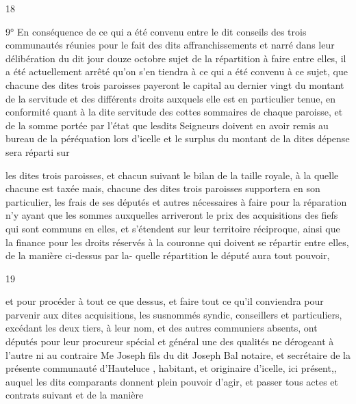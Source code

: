 \documentclass[a4paper,twoside,openany]{article}
\begin{document}
\begin{center}
18
\end{center}
9° En conséquence de ce qui a été convenu entre le dit
conseils des trois communautés réunies pour le
fait des dits affranchissements et narré dans leur
délibération du dit jour douze octobre sujet de la
répartition à faire entre elles, il a été actuellement
arrêté qu’on s’en tiendra à ce qui a été convenu à ce
sujet, que chacune des dites trois paroisses payeront le
capital au dernier vingt du montant de la servitude
et des différents droits auxquels elle est en particulier
tenue, en conformité quant à la dite servitude des
cottes sommaires de chaque paroisse, et de la somme
portée par l’état que lesdits Seigneurs doivent en avoir remis
au bureau de la péréquation lors d’icelle et le surplus
du montant de la dites dépense sera réparti sur


les dites trois paroisses, et chacun suivant le bilan
de la taille royale, à la quelle chacune est taxée
mais, chacune des dites trois paroisses supportera en
son particulier, les frais de ses députés et autres
nécessaires à faire pour la réparation n’y ayant que
les sommes auxquelles arriveront le prix des acquisitions
des fiefs qui sont communs en elles, et s’étendent
sur leur territoire réciproque, ainsi que la finance
pour les droits réservés à la couronne qui doivent se
répartir entre elles, de la manière ci-dessus par la-
quelle répartition le député aura tout pouvoir,

\begin{center}
19
\end{center}

et pour procéder à tout ce que dessus, et faire tout ce qu’il
conviendra pour parvenir aux dites acquisitions, les susnommés
syndic, conseillers et particuliers, excédant les deux
tiers, à leur nom, et des autres communiers absents,
ont députés pour leur procureur spécial et général
une des qualités ne dérogeant à l’autre ni au contraire
Me Joseph fils du dit Joseph Bal notaire, et secrétaire
de la présente communauté d’Hauteluce , habitant,
et originaire d’icelle, ici présent,, auquel les dits
comparants donnent  plein pouvoir d’agir, et passer
tous actes et contrats suivant et de la manière

\end{document}
